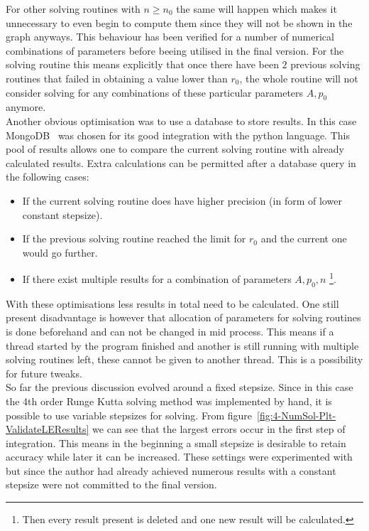 For other solving routines with $n\geq n_0$ the same will happen which makes it unnecessary to even begin to compute them since they will not be shown in the graph anyways.
This behaviour has been verified for a number of numerical combinations of parameters before beeing utilised in the final version.
For the solving routine this means explicitly that once there have been $2$ previous solving routines that failed in obtaining a value lower than $r_0$, the whole routine will not consider solving for any combinations of these particular parameters $A,p_0$ anymore.\\
Another obvious optimisation was to use a database to store results.
In this case MongoDB~\cite{dirolfPymongo11Python2021} was chosen for its good integration with the python language.
This pool of results allows one to compare the current solving routine with already calculated results.
Extra calculations can be permitted after a database query in the following cases:
\begin{itemize}
	\item If the current solving routine does have higher precision (in form of lower constant stepsize).
	\item If the previous solving routine reached the limit for $r_0$ and the current one would go further.
	\item If there exist multiple results for a combination of parameters $A,p_0,n$ \footnote{Then every result present is deleted and one new result will be calculated.}.
\end{itemize}
With these optimisations less results in total need to be calculated.
One still present disadvantage is however that allocation of parameters for solving routines is done beforehand and can not be changed in mid process.
This means if a thread started by the program finished and another is still running with multiple solving routines left, these cannot be given to another thread.
This is a possibility for future tweaks.\\
So far the previous discussion evolved around a fixed stepsize.
Since in this case the 4th order Runge Kutta solving method was implemented by hand, it is possible to use variable stepsizes for solving.
From figure~\ref{fig:4-NumSol-Plt-ValidateLEResults} we can see that the largest errors occur in the first step of integration.
This means in the beginning a small stepsize is desirable to retain accuracy while later it can be increased.
These settings were experimented with but since the author had already achieved numerous results with a constant stepsize were not committed to the final version.
